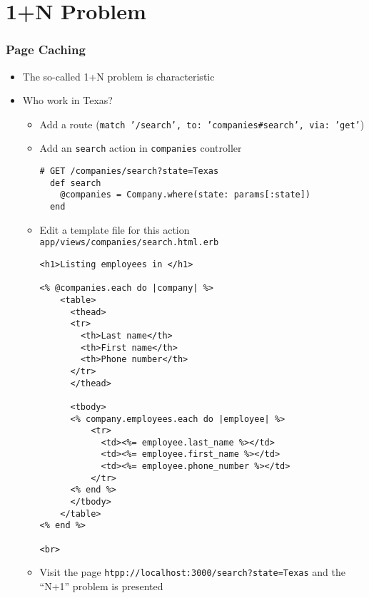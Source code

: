 \documentclass{beamer}
\begin{document}
\section{1+N Problem}
\begin{frame}
\frametitle{Page Caching}
\begin{itemize}
\item The so-called 1+N problem is characteristic 
\item Who work in Texas?
\begin{itemize}
\item Add a route (\texttt{match '/search', to: 'companies\#search', via: 'get'})
\item Add an \texttt{search} action in \texttt{companies} controller

\lstset{language=Ruby, style=eclipse}
\begin{lstlisting}[escapechar=&]
# GET /companies/search?state=Texas
  def search
    @companies = Company.where(state: params[:state])
  end
\end{lstlisting}

\item Edit a template file for this action \texttt{app/views/companies/search.html.erb}

\lstset{language=Ruby, style=eclipse}
\begin{lstlisting}[escapechar=&]
<h1>Listing employees in </h1>

<% @companies.each do |company| %>
    <table>
      <thead>
      <tr>
        <th>Last name</th>
        <th>First name</th>
        <th>Phone number</th>
      </tr>
      </thead>

      <tbody>
      <% company.employees.each do |employee| %>
          <tr>
            <td><%= employee.last_name %></td>
            <td><%= employee.first_name %></td>
            <td><%= employee.phone_number %></td>
          </tr>
      <% end %>
      </tbody>
    </table>
<% end %>

<br>
\end{lstlisting}

\item Visit the page \texttt{htpp://localhost:3000/search?state=Texas} and the ``N+1'' problem is presented


\end{itemize}
\end{itemize}
\end{frame}
\end{document}
